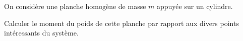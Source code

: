 


                                \initialisationPartieGauche %
On considère une planche homogène de masse $m$ appuyée sur un cylindre. 

Calculer le moment du poids de cette planche par rapport aux divers points intéressants du système.

